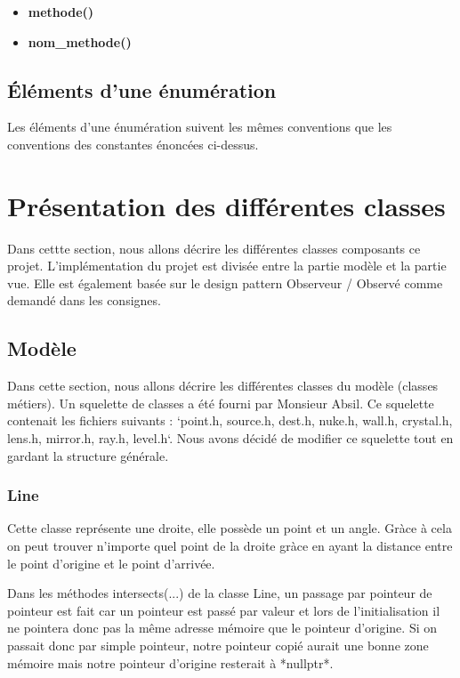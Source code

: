 \documentclass[]{article}
\begin{document}
\begin{itemize}
	\item \textbf{methode()}
	\item \textbf{nom\_methode()}
\end{itemize}

\subsection{Éléments d'une énumération} 

Les éléments d'une énumération suivent les mêmes conventions que les 
conventions des constantes énoncées ci-dessus.

\section{Présentation des différentes classes}

Dans cettte section, nous allons décrire les différentes classes
composants ce projet.
L’implémentation du projet est divisée entre la partie modèle et la partie vue.
Elle est également basée sur le design pattern  Observeur / Observé  comme demandé
dans les consignes.

\subsection{Modèle}

Dans cette section, nous allons décrire les différentes classes du modèle 
(classes métiers).
Un squelette de classes a été fourni par Monsieur Absil.
Ce squelette contenait les fichiers suivants :
`point.h, source.h, dest.h, nuke.h, wall.h,
crystal.h, lens.h, mirror.h, ray.h, level.h`.
Nous avons décidé de modifier ce squelette tout en gardant la 
structure générale.

\subsubsection{Line}


Cette classe représente une droite, elle possède un point et un
angle. Gràce à cela on peut trouver n'importe quel point de la 
droite gràce en ayant la distance entre le point d'origine
et le point d'arrivée.

Dans les méthodes intersects(...) de la classe Line, un passage
par pointeur de pointeur est fait car un pointeur est passé par 
valeur et lors de l'initialisation il ne pointera donc pas la même
adresse mémoire que le pointeur d'origine.
Si on passait donc par simple pointeur, notre pointeur copié
aurait une bonne zone mémoire mais notre pointeur d'origine
resterait à *nullptr*.
\end{document}
